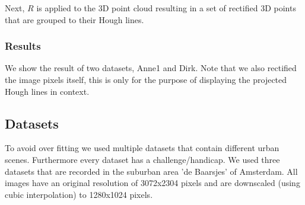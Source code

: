 Next, $R$ is applied to the 3D point cloud resulting in a set of rectified 3D
points that are grouped to their Hough lines.



\subsubsection{Results} %
We show the result of two datasets, Anne1 and Dirk.
Note that we also rectified the image pixels itself, this is only for
the purpose of displaying the projected Hough lines in context.

\newpage
{}
\clearpage

\newpage
{}




\subsection{Datasets}
To avoid over fitting we used multiple datasets that contain different urban
scenes.  Furthermore every dataset has a challenge/handicap.
We used three datasets that are recorded in the suburban area
'de Baarsjes' of Amsterdam.  All images have an original resolution of 3072x2304
pixels and are downscaled (using cubic interpolation) to 1280x1024 pixels.

